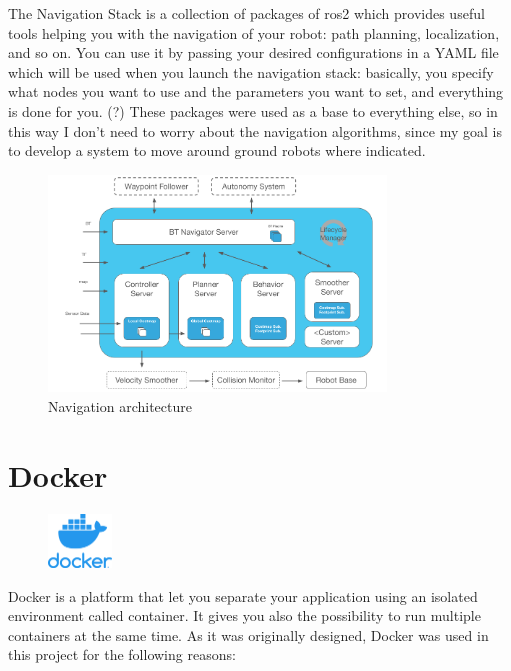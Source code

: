 The Navigation Stack is a collection of packages of \acrshort{ros}2 which provides useful tools helping you with the navigation of your robot: path planning, localization, and so on. You can use it by passing your desired configurations in a YAML file which will be used when you launch the navigation stack: basically, you specify what nodes you want to use and the parameters you want to set, and everything is done for you. (?)
These packages were used as a base to everything else, so in this way I don't need to worry about the navigation algorithms, since my goal is to develop a system to move around ground robots where indicated.

\begin{figure}[h]
    \centering
    \includegraphics[width=0.8\textwidth]{images/nav2_architecture}
    \caption{Navigation architecture}
  
  \end{figure}

\section{Docker}

\setlength\intextsep{0pt}
  
\begin{figure}
    \includegraphics[width=0.15\textwidth]{images/docker}
\end{figure}
  
Docker is a platform that let you separate your application using an isolated environment called container. It gives you also the possibility to run multiple containers at the same time. As it was originally designed, Docker was used in this project for the following reasons: %
  
